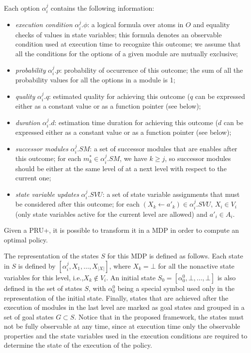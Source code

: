 Each option $\alpha_i^j$ contains the following information:
\begin{itemize}
\item \emph{execution condition} $\alpha_i^j.\phi$: a logical formula over atoms in $O$ and equality checks of values in state variables; this formula denotes an observable condition used at execution time to recognize this outcome; we assume that all the conditions for the options of a given module are mutually exclusive;
\item \emph{probability} $\alpha_i^j.p$: probability of occurrence of this outcome; the sum of all the probability values for all the options in a module is 1;
\item \emph{quality} $\alpha_i^j.q$: estimated quality for achieving this outcome ($q$ can be expressed either as a constant value or as a function pointer (see below);
\item \emph{duration} $\alpha_i^j.d$: estimation time duration for achieving this outcome ($d$ can be expressed either as a constant value or as a function pointer (see below);
\item \emph{successor modules} $\alpha_i^j.SM$: a set of successor modules that are enables after this outcome; for each $m_k^* \in \alpha_i^j.SM$, we have $k \geq j$, so successor modules should be either at the same level of at a next level with respect to the current one;
\item \emph{state variable updates} $\alpha_i^j.SVU$: a set of state variable assignments that must be considered after this outcome; for each $(X_k \leftarrow a'_k) \in \alpha_i^j.SVU$, $X_i \in V_i$ (only state variables active for the current level are allowed) and  $a'_i \in A_i$.
\end{itemize}

Given a PRU+, it is possible to transform it in a MDP in order to compute an optimal policy.

The representation of the states $S$ for this MDP is defined as follows.
Each state in $S$ is defined by $[  \alpha_i^j, X_1, \ldots, X_{|X|} ]$, where
$X_k = \bot$ for all the nonactive state variables for this level, i.e.,$ X_k \notin V_i$.
An initial state $S_0 = [ \alpha_0^0, \bot, \ldots, \bot ]$ is also defined in the set of states $S$, with $\alpha_0^0$ being a special symbol used only in the representation of the initial state. Finally, states that are achieved after the execution of modules in the last level are marked as goal states and grouped in a set of goal states $G \subset S$.
Notice that in the proposed framework, the states must not be fully observable at any time, since at execution time only the observable properties and the state variables used in the execution conditions are required to determine the state of the execution of the policy.

